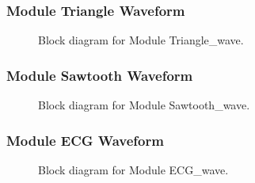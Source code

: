 \subsubsection{Module Triangle Waveform}
\begin{figure}[H]
	\centering
	\caption{Block diagram for Module Triangle\_wave.}
\end{figure}

\subsubsection{Module Sawtooth Waveform}
\begin{figure}[H]
	\centering
	\caption{Block diagram for Module Sawtooth\_wave.}
\end{figure}

\subsubsection{Module ECG Waveform}
\begin{figure}[H]
	\centering
	\caption{Block diagram for Module ECG\_wave.}
\end{figure}

